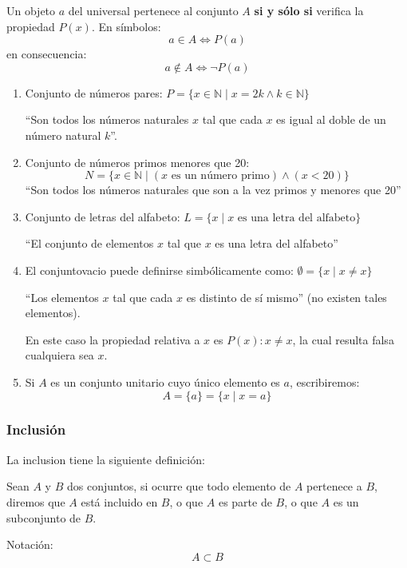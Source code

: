 Un objeto $a$ del universal pertenece al conjunto $A$ \textbf{si y sólo si} verifica la propiedad $P(x)$. En símbolos:
\[ a \in A \iff P(a) \]
en consecuencia:
\[ a \not \in A \iff \neg P(a) \]

\begin{fmd-example}
	\begin{enumerate}
		\item Conjunto de números pares: \(P = \{x \in \mathbb{N} \mid x = 2 k \land k \in \mathbb{N} \}\)
		
		``Son todos los números naturales $x$ tal que cada $x$ es igual al doble de un número natural $k$''.
		
		\item Conjunto de números primos menores que 20: \[N = \{x \in \mathbb{N} \mid (x \mbox{ es un número primo}) \land (x < 20) \}\]
		``Son todos los números naturales que son a la vez primos y menores que 20''
		
		\item Conjunto de letras del alfabeto: \(L = \{x \mid x \mbox{ es una letra del alfabeto}\}\)
		
		``El conjunto de elementos $x$ tal que $x$ es una letra del alfabeto''
		
		\item El \gls{conjuntovacio} puede definirse simbólicamente como: $\emptyset = \{ x \mid x \ne x \}$
		
		``Los elementos $x$ tal que cada $x$ es distinto de sí mismo'' (no existen tales elementos).
		
		En este caso la propiedad relativa a $x$ es $P(x): x \ne x$, la cual resulta falsa cualquiera sea $x$.
		
		\item Si $A$ es un conjunto unitario cuyo único elemento es $a$, escribiremos:
		\[ A = \{ a\} = \{ x \mid x = a \} \]
	\end{enumerate}
\end{fmd-example}

\subsubsection{Inclusión}
La \gls{inclusion} tiene la siguiente definición: 

\begin{fmd-definition}[Inclusión]
	Sean $A$ y $B$ dos conjuntos, si ocurre que todo elemento de $A$ pertenece a $B$, diremos que $A$ está incluido en $B$, o que $A$ es parte de $B$, o que $A$ es un subconjunto de $B$.
	
	Notación:  \[A \subset B\]
\end{fmd-definition}

